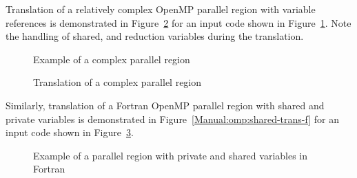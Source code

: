 Translation of a relatively complex OpenMP parallel region with variable references is demonstrated in
Figure~\ref{Manual:omp:preduction-trans} for an input code shown in
Figure~\ref{Manual:omp:preduction}. 
Note the handling of shared, and reduction variables during the translation.

\lstset{language=C,basicstyle=\scriptsize}
\begin{figure}[htbp]
{\indent
  {\mySmallFontSize
    \begin{latexonly}
    
    \end{latexonly}
    \begin{htmlonly}
    
    \end{htmlonly}
  }
}
\caption{Example of a complex parallel region}
\label{Manual:omp:preduction}
\end{figure}

\begin{figure}[htbp]
{\indent
  {\mySmallFontSize
    \begin{latexonly}
    
    \end{latexonly}
    \begin{htmlonly}
    
    \end{htmlonly}
  }
}
\caption{Translation of a complex parallel region}
\label{Manual:omp:preduction-trans}
\end{figure}

Similarly, translation of a Fortran OpenMP parallel region with shared and private variables
is demonstrated in
Figure~\ref{Manual:omp:shared-trans-f} for an input code shown in
Figure~\ref{Manual:omp:shared-f}.

\lstset{language=Fortran,basicstyle=\scriptsize}
\lstset{language=Fortran,basicstyle=\scriptsize,numbers=left}
\begin{figure}[htbp]
{\indent
  {\mySmallFontSize
    \begin{latexonly}
    
    \end{latexonly}
    \begin{htmlonly}
    
    \end{htmlonly}
  }
}
\caption{Example of a parallel region with private and shared variables in Fortran}
\label{Manual:omp:shared-f}
\end{figure}

